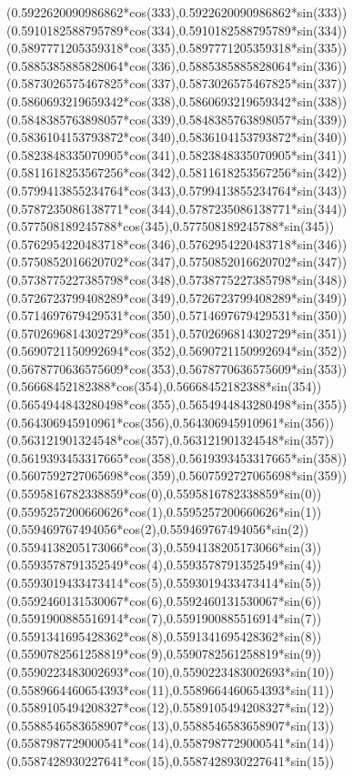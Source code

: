 {({0.5922620090986862*cos(333)},{0.5922620090986862*sin(333)})
({0.5910182588795789*cos(334)},{0.5910182588795789*sin(334)})
({0.5897771205359318*cos(335)},{0.5897771205359318*sin(335)})
({0.5885385885828064*cos(336)},{0.5885385885828064*sin(336)})
({0.5873026575467825*cos(337)},{0.5873026575467825*sin(337)})
({0.5860693219659342*cos(338)},{0.5860693219659342*sin(338)})
({0.5848385763898057*cos(339)},{0.5848385763898057*sin(339)})
({0.5836104153793872*cos(340)},{0.5836104153793872*sin(340)})
({0.5823848335070905*cos(341)},{0.5823848335070905*sin(341)})
({0.5811618253567256*cos(342)},{0.5811618253567256*sin(342)})
({0.5799413855234764*cos(343)},{0.5799413855234764*sin(343)})
({0.5787235086138771*cos(344)},{0.5787235086138771*sin(344)})
({0.577508189245788*cos(345)},{0.577508189245788*sin(345)})
({0.5762954220483718*cos(346)},{0.5762954220483718*sin(346)})
({0.5750852016620702*cos(347)},{0.5750852016620702*sin(347)})
({0.5738775227385798*cos(348)},{0.5738775227385798*sin(348)})
({0.5726723799408289*cos(349)},{0.5726723799408289*sin(349)})
({0.5714697679429531*cos(350)},{0.5714697679429531*sin(350)})
({0.5702696814302729*cos(351)},{0.5702696814302729*sin(351)})
({0.5690721150992694*cos(352)},{0.5690721150992694*sin(352)})
({0.5678770636575609*cos(353)},{0.5678770636575609*sin(353)})
({0.56668452182388*cos(354)},{0.56668452182388*sin(354)})
({0.5654944843280498*cos(355)},{0.5654944843280498*sin(355)})
({0.564306945910961*cos(356)},{0.564306945910961*sin(356)})
({0.563121901324548*cos(357)},{0.563121901324548*sin(357)})
({0.5619393453317665*cos(358)},{0.5619393453317665*sin(358)})
({0.5607592727065698*cos(359)},{0.5607592727065698*sin(359)})
({0.5595816782338859*cos(0)},{0.5595816782338859*sin(0)})
({0.5595257200660626*cos(1)},{0.5595257200660626*sin(1)})
({0.559469767494056*cos(2)},{0.559469767494056*sin(2)})
({0.5594138205173066*cos(3)},{0.5594138205173066*sin(3)})
({0.5593578791352549*cos(4)},{0.5593578791352549*sin(4)})
({0.5593019433473414*cos(5)},{0.5593019433473414*sin(5)})
({0.5592460131530067*cos(6)},{0.5592460131530067*sin(6)})
({0.5591900885516914*cos(7)},{0.5591900885516914*sin(7)})
({0.5591341695428362*cos(8)},{0.5591341695428362*sin(8)})
({0.5590782561258819*cos(9)},{0.5590782561258819*sin(9)})
({0.5590223483002693*cos(10)},{0.5590223483002693*sin(10)})
({0.5589664460654393*cos(11)},{0.5589664460654393*sin(11)})
({0.5589105494208327*cos(12)},{0.5589105494208327*sin(12)})
({0.5588546583658907*cos(13)},{0.5588546583658907*sin(13)})
({0.5587987729000541*cos(14)},{0.5587987729000541*sin(14)})
({0.5587428930227641*cos(15)},{0.5587428930227641*sin(15)})
}

